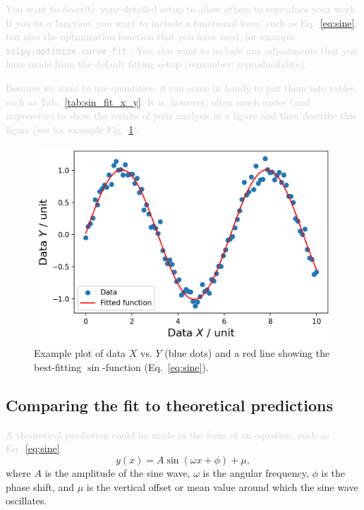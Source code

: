 \documentclass[twocolumn,apj,numberedappendix,appendixfloats]{openjournal}
\newcommand{\comment}[1]{\textcolor{lightgray}{#1}}
\begin{document}
\comment{You want to describe your detailed setup to allow others to reproduce your work. If you fit a function, you want to include a functional form, such as Eq.~\ref{eq:sine}, but also the optimization function that you have used, for example \texttt{scipy.optimize.curve\_fit} \citep{Scipy}. You also want to include any adjustments that you have made from the default fitting setup (remember: reproducibility).}

\comment{Because we want to use quantities, it can come in handy to put them into tables, such as Tab.~\ref{tab:sin_fit_x_y}. It is, however, often much easier (and impressive) to show the results of your analysis in a figure and then describe this figure (see for example Fig.~\ref{fig:sin_fit_x_y}).}




\begin{figure}
    \centering
    \includegraphics[width=\columnwidth]{figures/sin_fit_x_y.png}
    \caption{Example plot of data $X$ vs. $Y$ (blue dots) and a red line showing the best-fitting $\sin$-function (Eq.~\ref{eq:sine}).}
    \label{fig:sin_fit_x_y}
\end{figure}

\subsection{Comparing the fit to theoretical predictions} \label{sec:analysis_comparison}

\comment{A theoretical prediction could be made in the form of an equation, such as Eq.~\ref{eq:sine}:}
\begin{equation}
    y(x) = A \sin(\omega x + \phi) + \mu, \label{eq:sine}
\end{equation}
where $A$ is the amplitude of the sine wave, $\omega$ is the angular frequency, $\phi$ is the phase shift, and $\mu$ is the vertical offset or mean value around which the sine wave oscillates.
\end{document}
